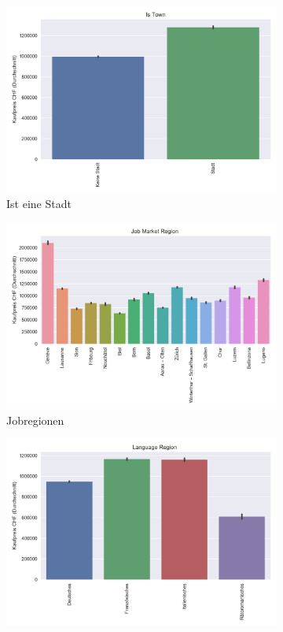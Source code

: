 \begin{figure}[h]
\begin{subfigure}{.5\textwidth}
  \includegraphics[width=\linewidth]{images/anhang/analysis/barplot_is_town.png}
  \caption{Ist eine Stadt} 
\end{subfigure}
\begin{subfigure}{.5\textwidth}
  \centering
  \includegraphics[width=\linewidth]{images/anhang/analysis/barplot_job_market_region_id.png}
  \caption{Jobregionen} 
\end{subfigure}
\begin{subfigure}{.5\textwidth}
  \centering
  \includegraphics[width=\linewidth]{images/anhang/analysis/barplot_language_region_id.png}

\end{subfigure}
\end{figure}
